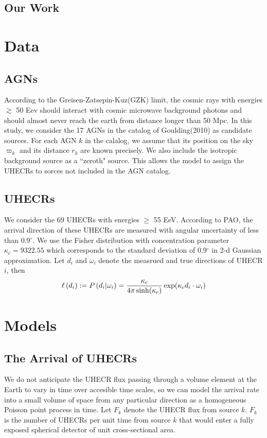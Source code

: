 \documentclass[dvips,aoas]{imsart}
\newcommand{\be}{\begin{equation}}
\newcommand{\ee}{\end{equation}}
\begin{document}
\subsection{Our Work}


\section{Data}
\subsection{AGNs}
According to the Greisen-Zatsepin-Kuz(GZK)
limit, the cosmic rays with energies $\gtrsim$ 50 Eev should interact with cosmic
microwave background photons and should almost never reach the earth from distance
longer than 50 Mpc. In this study, we consider the 17 AGNs in the catalog of
Goulding(2010) as candidate sources. For each AGN $k$ in the calalog, we assume
that its position on the sky $\varpi_k$ and its distance $r_k$ are known precisely.
We also include the isotropic background source as a ``zeroth" source. This allows the model
to assign the UHECRs to sorces not included in the AGN catalog.

\subsection{UHECRs}
We consider the 69 UHECRs with energies $\geq$ 55 EeV. According to PAO, the arrival direction of these UHECRs are measured
with angular uncertainty of less than 0.9$^\circ$. We use the Fisher distribution
with concentration parameter $\kappa_c = 9322.55$ which corresponds to the
standard deviation of 0.9$^\circ$ in 2-d Gaussian approximation. Let $d_i$ and $\omega_i$
denote the measrued and true directions of UHECR $i$, then
\be
\ell\left(d_i\right) := P\left(d_i|\omega_i\right)={\kappa_c\over4\pi\sinh(\kappa_c)}\exp(\kappa_cd_i\cdot\omega_i)
\ee

\section{Models}
\subsection{The Arrival of UHECRs}
We do not anticipate the UHECR flux passing through a volume element at the Earth to vary in time
over accesible time scales, so we can model the arrival rate into a small volume of space from
any particular direction as a homogeneous Poisson point process in time.
Let $F_k$ denote the UHECR flux from source $k$. $F_k$ is the number of UHECRs per unit time
from source $k$ that would enter a fully exposed spherical detector of unit cross-sectional area.
\end{document}
